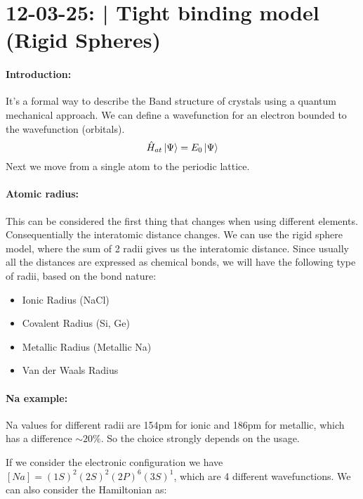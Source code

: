 \section{12-03-25: | Tight binding model (Rigid Spheres)}

\paragraph{Introduction:}It's a formal way to describe the Band structure of crystals using a quantum mechanical approach. We can define a wavefunction for an electron bounded to the wavefunction (orbitals).
\begin{equation}
    \hat{H}_{at} \ket{\Psi} = E_0 \ket{\Psi}
\end{equation}
Next we move from a single atom to the periodic lattice.

\paragraph{Atomic radius:} This can be considered the first thing that changes when using different elements. Consequentially the interatomic distance changes. We can use the rigid sphere model, where the sum of 2 radii gives us the interatomic distance. Since usually all the distances are expressed as chemical bonds, we will have the following type of radii, based on the bond nature:
\begin{itemize}
    \item Ionic Radius (NaCl)
    \item Covalent Radius (Si, Ge)
    \item Metallic Radius (Metallic Na)
    \item Van der Waals Radius 
\end{itemize}

\paragraph{Na example:}
Na values for different radii are 154pm for ionic and 186pm for metallic, which has a difference $\sim 20\%$. So the choice strongly depends on the usage.

If we consider the electronic configuration we have $[Na] = (1S)^2(2S)^2(2P)^6(3S)^1$, which are 4 different wavefunctions. We can also consider the Hamiltonian as:

